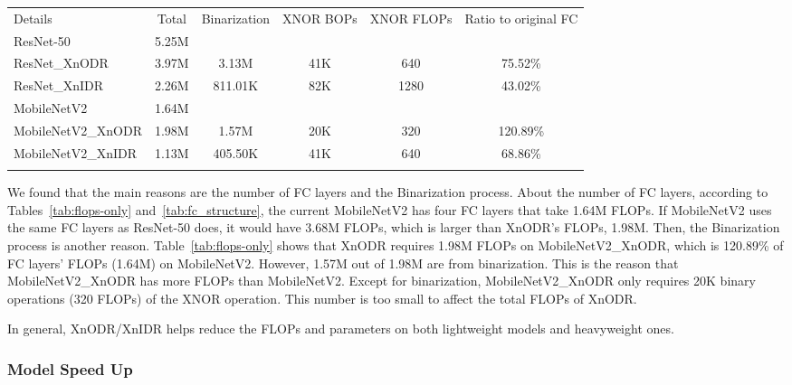 \documentclass[sn-mathphys,iicol,Numbered]{sn-jnl}
\begin{document}
\begin{table*}[ht]
\centering
\caption{shows the FLOPs of the original FC layers and that of XnODR/XnIDR. For the sake of comprehensive comparison, we list the FLOPs of binarization, the BOPs (binary operations) of XNOR operation, the FLOPs of XNOR operation, and the ratio of the FLOPs of XnODR/XnIDR over that of the original FC layers.}
\begin{tabular}{l|c|c|c|c|c} 
\toprule
\multirow{2}{*}{Details} & \multirow{2}{*}{Total} & \multirow{2}{*}{Binarization} & \multirow{2}{*}{XNOR BOPs} & \multirow{2}{*}{XNOR FLOPs} & \multirow{2}{2.cm}{Ratio to original FC} \\
&&&&& \\
\midrule
ResNet-50 & 5.25M & & & & \\
ResNet\_XnODR & 3.97M & 3.13M & 41K & 640 & 75.52\% \\
ResNet\_XnIDR & 2.26M & 811.01K & 82K & 1280 & 43.02\% \\
MobileNetV2 & 1.64M & & & & \\
MobileNetV2\_XnODR & 1.98M & 1.57M & 20K & 320 & 120.89\% \\
MobileNetV2\_XnIDR & 1.13M & 405.50K & 41K & 640 & 68.86\% \\
\botrule
\end{tabular}
\label{tab:flops-only}
\end{table*}

We found that the main reasons are the number of FC layers and the Binarization process. About the number of FC layers, according to Tables~\ref{tab:flops-only} and~\ref{tab:fc_structure}, the current MobileNetV2 has four FC layers that take 1.64M FLOPs. If MobileNetV2 uses the same FC layers as ResNet-50 does, it would have 3.68M FLOPs, which is larger than XnODR's FLOPs, 1.98M. Then, the Binarization process is another reason. Table~\ref{tab:flops-only} shows that XnODR requires 1.98M FLOPs on MobileNetV2\_XnODR, which is 120.89\% of FC layers' FLOPs (1.64M) on MobileNetV2. However, 1.57M out of 1.98M are from binarization. This is the reason that MobileNetV2\_XnODR has more FLOPs than MobileNetV2. Except for binarization, MobileNetV2\_XnODR only requires 20K binary operations (320 FLOPs) of the XNOR operation. This number is too small to affect the total FLOPs of XnODR. 

In general, XnODR/XnIDR helps reduce the FLOPs and parameters on both lightweight models and heavyweight ones.

\subsubsection{Model Speed Up} \label{sec:4.4.3}
\end{document}

